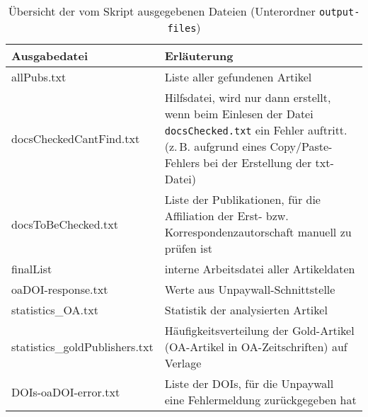 \begin{appendices}
\begin{table}[h]
\caption{Übersicht der vom Skript ausgegebenen Dateien (Unterordner \texttt{output-files})}
    \begin{tabularx}{1\textwidth}{p{5cm}p{9cm}}
    \toprule
     Ausgabedatei & Erläuterung \\
     \midrule
    allPubs.txt & Liste aller gefundenen Artikel \\
    docsCheckedCantFind.txt & Hilfsdatei, wird nur dann erstellt, wenn beim Einlesen der Datei \texttt{docsChecked.txt} ein Fehler auftritt. (z.\,B. aufgrund eines Copy/Paste-Fehlers bei der Erstellung der txt-Datei) \\
    docsToBeChecked.txt & Liste der Publikationen, für die Affiliation der Erst- bzw. Korrespondenzautorschaft manuell zu prüfen ist \\
    finalList & interne Arbeitsdatei aller Artikeldaten \\
    oaDOI-response.txt & Werte aus Unpaywall-Schnittstelle  \\
    statistics\_OA.txt & Statistik der analysierten Artikel \\
    statistics\_goldPublishers.txt & Häufigkeitsverteilung der Gold-Artikel (OA-Artikel in OA-Zeitschriften) auf Verlage \\
	DOIs-oaDOI-error.txt & Liste der DOIs, für die Unpaywall eine Fehlermeldung zurückgegeben hat \\
	\bottomrule
    \end{tabularx}
\end{table}


\end{appendices}
